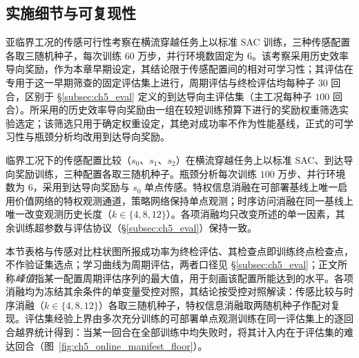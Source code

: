 \subsection{实施细节与可复现性}\label{subsec:ch5_online_impl}

亚临界工况的传感可行性考察在横流穿越任务上以标准 SAC 训练，三种传感配置各取三随机种子，每次训练 $60$ 万步，并行环境数固定为 $6$。该考察采用历史效率导向奖励，作为本章早期设定，其结论限于传感配置间的相对可学习性；其评估在专用于这一早期筛查的固定评估集上进行，周期评估与终检评估均每种子 $30$ 回合，区别于 \S\ref{subsec:ch5_eval} 定义的到达导向主评估集（主工况每种子 $100$ 回合）。所采用的历史效率导向奖励由一组在较短训练预算下进行的奖励权重筛选实验选定；该筛选只用于确定权重设定，其绝对成功率不作为性能基线，正式的可学习性与瓶颈分析均改用到达导向奖励。

临界工况下的传感配置比较（$s_0$、$s_1$、$s_2$）在横流穿越任务上以标准 SAC、到达导向奖励训练，三种配置各取三随机种子。瓶颈分析每次训练 $100$ 万步、并行环境数为 $6$，采用到达导向奖励与 $s_0$ 单点传感。特权信息消融在可部署基线上唯一启用价值网络的特权观测通道，策略网络保持单点观测；时序访问消融在同一基线上唯一改变观测历史长度（$k\in\{4,8,12\}$）。各项消融均只改变所述的单一因素，其余训练超参数与评估协议（\S\ref{subsec:ch5_eval}）保持一致。

本节表格与传感对比柱状图所报成功率为终检评估、其检查点即训练终点检查点，不作验证集选点；学习曲线为周期评估，两者口径见 \S\ref{subsec:ch5_eval}；正文所称\emph{峰值}指某一配置周期评估序列的最大值，用于刻画该配置所能达到的水平。各项消融均为冻结其余条件的单变量受控对照，其结论按受控对照解读：传感比较与时序消融（$k\in\{4,8,12\}$）各取三随机种子，特权信息消融取两随机种子作配对复现。评估集经验上界由多次充分训练的可部署单点观测训练在同一评估集上的逐回合越界统计得到：当某一回合在全部训练中均失败时，将其计入内在于评估集的难达回合（图~\ref{fig:ch5_online_manifest_floor}）。

\clearpage
